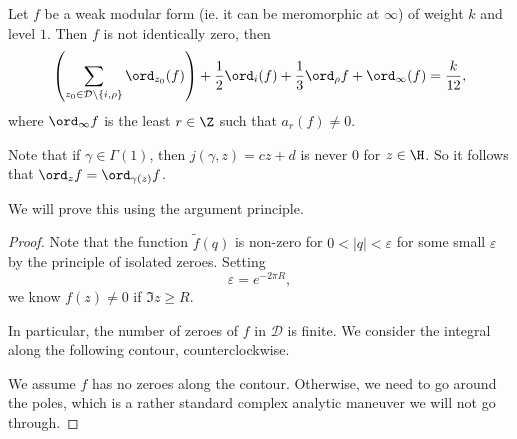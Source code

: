 \documentclass[a4paper]{article}
\begin{document}
\begin{prop}
  Let $f$ be a weak modular form (ie. it can be meromorphic at $\infty$) of weight $k$ and level $1$. Then $f$ is not identically zero, then
  \[
    \left(\sum_{z_0 \in \mathcal{D} \setminus \{i, \rho\}} \ord_{z_0} (f)\right) + \frac{1}{2} \ord_i(f) + \frac{1}{3} \ord_\rho f + \ord_\infty(f) = \frac{k}{12},
  \]
  where $\ord_\infty f$ is the least $r \in \Z$ such that $a_r(f) \not= 0$.
\end{prop}
Note that if $\gamma \in \Gamma(1)$, then $j(\gamma, z) = cz + d$ is never $0$ for $z \in \H$. So it follows that $\ord_z f = \ord_{\gamma(z)} f$.

We will prove this using the argument principle.
\begin{proof}
  Note that the function $\tilde{f}(q)$ is non-zero for $0 < |q| < \varepsilon$ for some small $\varepsilon$ by the principle of isolated zeroes. Setting
  \[
    \varepsilon = e^{-2\pi R},
  \]
  we know $f(z) \not= 0$ if $\Im z \geq R$.

  In particular, the number of zeroes of $f$ in $\mathcal{D}$ is finite. We consider the integral along the following contour, counterclockwise.
  \begin{center}
  \end{center}
  We assume $f$ has no zeroes along the contour. Otherwise, we need to go around the poles, which is a rather standard complex analytic maneuver we will not go through.


\end{proof}
\end{document}
